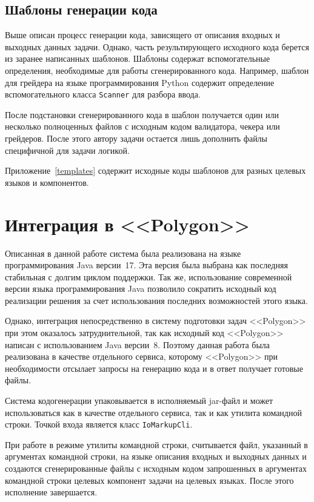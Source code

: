 \documentclass[times,specification,annotation]{style/itmo-student-thesis/itmo-student-thesis}
\begin{document}
\subsection{Шаблоны генерации кода}

Выше описан процесс генерации кода, зависящего от описания входных и выходных данных задачи. Однако, часть результирующего исходного кода берется из заранее написанных шаблонов. Шаблоны содержат вспомогательные определения, необходимые для работы сгенерированного кода. Например, шаблон для грейдера на языке программирования Python содержит определение вспомогательного класса \texttt{Scanner} для разбора ввода.

После подстановки сгенерированного кода в шаблон получается один или несколько полноценных файлов с исходным кодом валидатора, чекера или грейдеров. После этого автору задачи остается лишь дополнить файлы специфичной для задачи логикой.

Приложение~\ref{templates} содержит исходные коды шаблонов для разных целевых языков и компонентов.

\section{Интеграция в <<Polygon>>}

Описанная в данной работе система была реализована на языке программирования Java версии~17. Эта версия была выбрана как последняя стабильная с долгим циклом поддержки. Так же, использование современной версии языка программирования Java позволило сократить исходный код реализации решения за счет использования последних возможностей этого языка.

Однако, интеграция непосредственно в систему подготовки задач <<Polygon>> при этом оказалось затруднительной, так как исходный код <<Polygon>> написан с использованием Java версии~8. Поэтому данная работа была реализована в качестве отдельного сервиса, которому <<Polygon>> при необходимости отсылает запросы на генерацию кода и в ответ получает готовые файлы.

Система кодогенерации упаковывается в исполняемый jar-файл и может использоваться как в качестве отдельного сервиса, так и как утилита командной строки. Точкой входа является класс \texttt{IoMarkupCli}.

При работе в режиме утилиты командной строки, считывается файл, указанный в аргументах командной строки, на языке описания входных и выходных данных и создаются сгенерированные файлы с исходным кодом запрошенных в аргументах командной строки целевых компонент задачи на целевых языках. После этого исполнение завершается.
\end{document}
